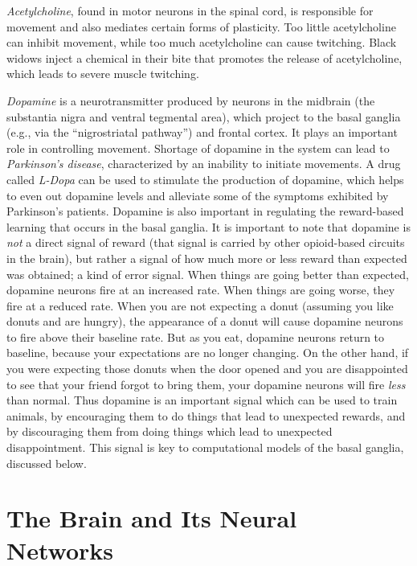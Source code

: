 \emph{Acetylcholine}, found in motor neurons in the spinal cord, is responsible for movement and also mediates certain forms of plasticity. Too little acetylcholine can inhibit movement, while too much acetylcholine can cause twitching. Black widows inject a chemical in their bite that promotes the release of acetylcholine, which leads to severe muscle twitching.

\emph{Dopamine} is a neurotransmitter produced by neurons in the midbrain (the substantia nigra and ventral tegmental area), which project to the basal ganglia (e.g., via the ``nigrostriatal pathway'') and frontal cortex. It plays an important role in controlling movement. Shortage of dopamine in the system can lead to \emph{Parkinson's disease}, characterized by an inability to initiate movements. A drug called \emph{L-Dopa} can be used to stimulate the production of dopamine, which helps to even out dopamine levels and alleviate some of the symptoms exhibited by Parkinson's patients. Dopamine is also important in regulating the reward-based learning that occurs in the basal ganglia. It is important to note that dopamine is \emph{not} a direct signal of reward (that signal is carried by other opioid-based circuits in the brain), but rather a signal of how much more or less reward than expected was obtained; a kind of error signal. When things are going better than expected, dopamine neurons fire at an increased rate. When things are going worse, they fire at a reduced rate. When you are not expecting a donut (assuming you like donuts and are hungry), the appearance of a donut will cause dopamine neurons to fire above their baseline rate. But as you eat, dopamine neurons return to baseline, because your expectations are no longer changing. On the other hand, if you were expecting those donuts when the door opened and you are disappointed to see that your friend forgot to bring them, your dopamine neurons will fire \emph{less} than normal. Thus dopamine is an important signal which can be used to train animals, by encouraging them to do things that lead to unexpected rewards, and by discouraging them from doing things which lead to unexpected disappointment. This signal is key to computational models of the basal ganglia, discussed below.

\section{The Brain and Its Neural Networks}

